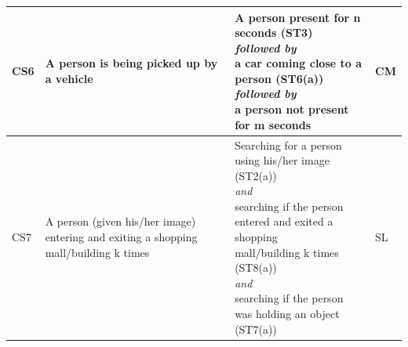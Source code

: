 \documentclass[11pt]{article}
\begin{document}
\begin{table}[htbp]
{\begin{tabular}{|p{}|p{}|p{}|p{}|}
CS6 & A person is being picked up by a vehicle & \makecell[l]{A person present for n seconds (ST3) \\ 
\textit{followed by} \\
a car coming close to a person (ST6(a)) \\ 
\textit{followed by} \\
a person not present for m seconds} & CM \\ \hline
CS7 & A person (given his/her image) entering and exiting a shopping mall/building k times & \makecell[l]{Searching for a person using his/her image (ST2(a)) \\ \textit{and} \\
searching if the person entered and exited a shopping\\
 mall/building k times (ST8(a)) \\
\textit{and} 
\\
searching if the person was holding an object (ST7(a))} 
& SL \\ \hline
\end{tabular}
}
\end{table}
\end{document}
